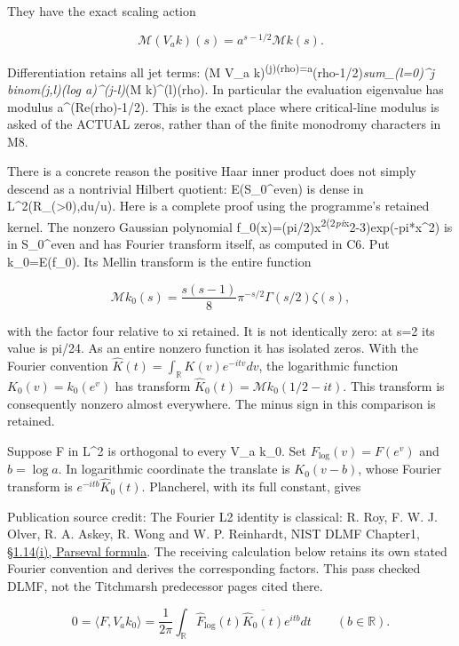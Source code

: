 They have the exact scaling action

\[
\mathcal M(V_a k)(s)=a^{s-1/2}\mathcal M k(s).
\tag{M9.4}
\]

Differentiation retains all jet terms: (M V\_a
k)\textsuperscript{(j)(rho)=a}(rho-1/2)\emph{sum\_(l=0)\^{}j
binom(j,l)(log a)\^{}(j-l)}(M k)\^{}(l)(rho). In particular the
evaluation eigenvalue has modulus a\^{}(Re(rho)-1/2). This is the exact
place where critical-line modulus is asked of the ACTUAL zeros, rather
than of the finite monodromy characters in M8.

There is a concrete reason the positive Haar inner product does not
simply descend as a nontrivial Hilbert quotient: E(S\_0\^{}even) is
dense in L\^{}2(R\_(\textgreater0),du/u). Here is a complete proof using
the programme's retained kernel. The nonzero Gaussian polynomial
f\_0(x)=(pi/2)x\textsuperscript{2(2\emph{pi}x}2-3)exp(-pi*x\^{}2) is in
S\_0\^{}even and has Fourier transform itself, as computed in C6. Put
k\_0=E(f\_0). Its Mellin transform is the entire function

\[
\mathcal M k_0(s)=\frac{s(s-1)}8\pi^{-s/2}\Gamma(s/2)\zeta(s),
\tag{M9.5}
\]

with the factor four relative to xi retained. It is not identically
zero: at s=2 its value is pi/24. As an entire nonzero function it has
isolated zeros. With the Fourier convention
\(\widehat K(t)=\int_{\mathbb R}K(v)e^{-itv}dv\), the logarithmic
function \(K_0(v)=k_0(e^v)\) has transform
\(\widehat K_0(t)=\mathcal M k_0(1/2-it)\). This transform is
consequently nonzero almost everywhere. The minus sign in this
comparison is retained.

Suppose F in L\^{}2 is orthogonal to every V\_a k\_0. Set
\(F_{\log}(v)=F(e^v)\) and \(b=\log a\). In logarithmic coordinate the
translate is \(K_0(v-b)\), whose Fourier transform is
\(e^{-itb}\widehat K_0(t)\). Plancherel, with its full constant, gives

Publication source credit: The Fourier L2 identity is classical: R. Roy,
F. W. J. Olver, R. A. Askey, R. Wong and W. P. Reinhardt, NIST DLMF
Chapter1, \href{https://dlmf.nist.gov/1.14\#i}{§1.14(i), Parseval
formula}. The receiving calculation below retains its own stated Fourier
convention and derives the corresponding factors. This pass checked
DLMF, not the Titchmarsh predecessor pages cited there.

\[
0=\langle F,V_a k_0\rangle
=\frac1{2\pi}\int_{\mathbb R}
\widehat F_{\log}(t)\overline{\widehat K_0(t)}e^{itb}dt
\qquad(b\in\mathbb R).
\tag{M9.6}
\]

